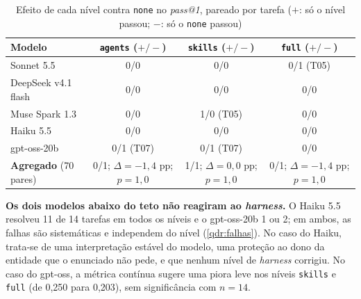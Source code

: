 \begin{table}[htb]
    \centering
    \ABNTEXfontereduzida
    \caption{Efeito de cada nível contra \texttt{none} no \textit{pass@1}, pareado por tarefa ($+$: só o nível passou; $-$: só o \texttt{none} passou)}
    \label{tab:pareado}
    \begin{tabular}{lccc}
        \toprule
        \textbf{Modelo} & \texttt{agents} ($+/-$) & \texttt{skills} ($+/-$) & \texttt{full} ($+/-$) \\
        \midrule
        Sonnet 5.5 & 0/0 & 0/0 & 0/1 (T05) \\
        DeepSeek v4.1 flash & 0/0 & 0/0 & 0/0 \\
        Muse Spark 1.3 & 0/0 & 1/0 (T05) & 0/0 \\
        Haiku 5.5 & 0/0 & 0/0 & 0/0 \\
        gpt-oss-20b & 0/1 (T07) & 0/1 (T07) & 0/0 \\
        \midrule
        \textbf{Agregado} (70 pares) & 0/1; $\Delta = -1{,}4$ pp; $p = 1{,}0$ & 1/1; $\Delta = 0{,}0$ pp; $p = 1{,}0$ & 0/1; $\Delta = -1{,}4$ pp; $p = 1{,}0$ \\
        \bottomrule
    \end{tabular}
    \fonteautor
\end{table}

\textbf{Os dois modelos abaixo do teto não reagiram ao \textit{harness}.} O
Haiku 5.5 resolveu 11 de 14 tarefas em todos os níveis e o gpt-oss-20b 1 ou 2;
em ambos, as falhas são sistemáticas e independem do nível
(\autoref{qdr:falhas}). No caso do Haiku, trata-se de uma interpretação estável
do modelo, uma proteção ao dono da entidade que o enunciado não pede, e que
nenhum nível de \textit{harness} corrigiu. No caso do gpt-oss, a métrica contínua
sugere uma piora leve nos níveis \texttt{skills} e \texttt{full} (de 0,250 para
0,203), sem significância com $n = 14$.

